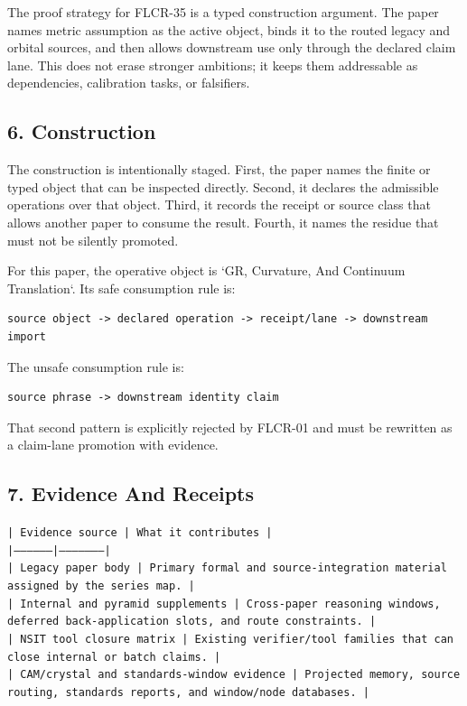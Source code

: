 \documentclass[11pt]{article}
\begin{document}
The proof strategy for FLCR-35 is a typed construction argument. The paper names metric assumption as the active object, binds it to the routed legacy and orbital sources, and then allows downstream use only through the declared claim lane. This does not erase stronger ambitions; it keeps them addressable as dependencies, calibration tasks, or falsifiers.

\subsection*{6. Construction}

The construction is intentionally staged. First, the paper names the finite or
typed object that can be inspected directly. Second, it declares the admissible
operations over that object. Third, it records the receipt or source class that
allows another paper to consume the result. Fourth, it names the residue that
must not be silently promoted.

For this paper, the operative object is `GR, Curvature, And Continuum Translation`. Its safe consumption
rule is:

\begin{verbatim}
source object -> declared operation -> receipt/lane -> downstream import
\end{verbatim}

The unsafe consumption rule is:

\begin{verbatim}
source phrase -> downstream identity claim
\end{verbatim}

That second pattern is explicitly rejected by FLCR-01 and must be rewritten as
a claim-lane promotion with evidence.

\subsection*{7. Evidence And Receipts}

\noindent\texttt{| Evidence source | What it contributes |}\\
\noindent\texttt{|-----------------|---------------------|}\\
\noindent\texttt{| Legacy paper body | Primary formal and source-integration material assigned by the series map. |}\\
\noindent\texttt{| Internal and pyramid supplements | Cross-paper reasoning windows, deferred back-application slots, and route constraints. |}\\
\noindent\texttt{| NSIT tool closure matrix | Existing verifier/tool families that can close internal or batch claims. |}\\
\noindent\texttt{| CAM/crystal and standards-window evidence | Projected memory, source routing, standards reports, and window/node databases. |}\\
\end{document}
